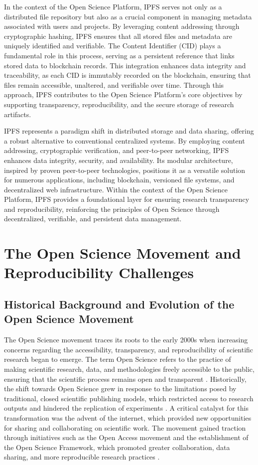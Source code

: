 \documentclass[final]{rc-book-2.14}
\begin{document}
In the context of the Open Science Platform, IPFS serves not only as a distributed file repository but also as a crucial component in managing metadata associated with users and projects. By leveraging content addressing through cryptographic hashing, IPFS ensures that all stored files and metadata are uniquely identified and verifiable. The Content Identifier (CID) plays a fundamental role in this process, serving as a persistent reference that links stored data to blockchain records. This integration enhances data integrity and traceability, as each CID is immutably recorded on the blockchain, ensuring that files remain accessible, unaltered, and verifiable over time. Through this approach, IPFS contributes to the Open Science Platform’s core objectives by supporting transparency, reproducibility, and the secure storage of research artifacts.

IPFS represents a paradigm shift in distributed storage and data sharing, offering a robust alternative to conventional centralized systems. By employing content addressing, cryptographic verification, and peer-to-peer networking, IPFS enhances data integrity, security, and availability. Its modular architecture, inspired by proven peer-to-peer technologies, positions it as a versatile solution for numerous applications, including blockchain, versioned file systems, and decentralized web infrastructure. Within the context of the Open Science Platform, IPFS provides a foundational layer for ensuring research transparency and reproducibility, reinforcing the principles of Open Science through decentralized, verifiable, and persistent data management.

\section{The Open Science Movement and Reproducibility Challenges}

\subsection{Historical Background and Evolution of the Open Science Movement}
The Open Science movement traces its roots to the early 2000s when increasing concerns regarding the accessibility, transparency, and reproducibility of scientific research began to emerge. The term Open Science refers to the practice of making scientific research, data, and methodologies freely accessible to the public, ensuring that the scientific process remains open and transparent \cite{Boulton2015}. Historically, the shift towards Open Science grew in response to the limitations posed by traditional, closed scientific publishing models, which restricted access to research outputs and hindered the replication of experiments \cite{Borgman2012}. A critical catalyst for this transformation was the advent of the internet, which provided new opportunities for sharing and collaborating on scientific work. The movement gained traction through initiatives such as the Open Access movement and the establishment of the Open Science Framework, which promoted greater collaboration, data sharing, and more reproducible research practices \cite{Nosek2015}.
\end{document}
